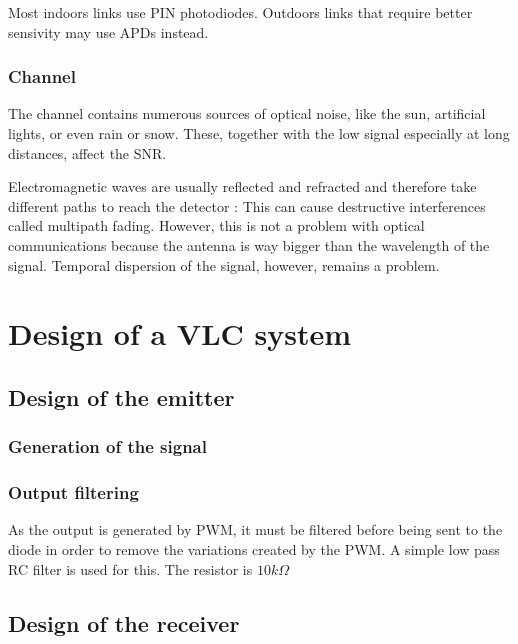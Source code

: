 \documentclass[12pt]{report}
\begin{document}
Most indoors links use PIN photodiodes. Outdoors links that require better sensivity may use APDs instead.

\subsection{Channel}

The channel contains numerous sources of optical noise, like the sun, artificial lights, or even rain or snow. These, together with the low signal especially at long distances, affect the SNR.

Electromagnetic waves are usually reflected and refracted and therefore take different paths to reach the detector : This can cause destructive interferences called multipath fading. However, this is not a problem with optical communications because the antenna is way bigger than the wavelength of the signal. Temporal dispersion of the signal, however, remains a problem.













\chapter{Design of a VLC system}

\section{Design of the emitter}

\subsection{Generation of the signal}

\subsection{Output filtering}

As the output is generated by PWM, it must be filtered before being sent to the diode in order to remove the variations created by the PWM. A simple low pass RC filter is used for this.
The resistor is $10k\Omega$

\section{Design of the receiver}
\end{document}

